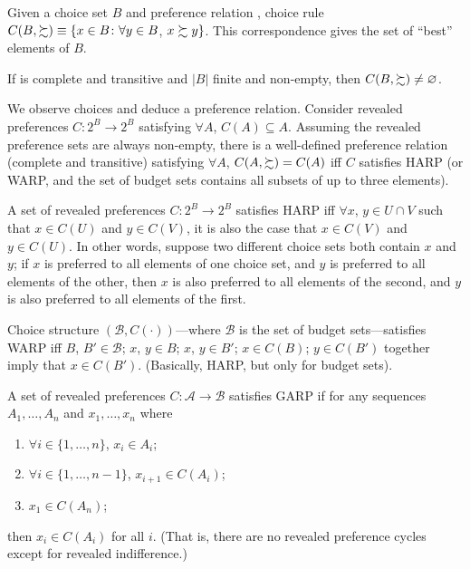 \documentclass[8pt,letterpaper, landscape]{extarticle} %
\begin{document}
\begin{multicols}{3}
\begin{description}
 Given a choice set $ B $ and preference relation \pref , choice rule $ C(B, \succsim ) \equiv \{ x \in B \colon \forall y \in B $, $ x \succsim y \} $. This correspondence gives the set of ``best'' elements of $ B $.

If \pref{} is complete and transitive and $ | B | $ finite and non-empty, then $ C(B, \succsim) \neq \varnothing $.

 We observe choices and deduce a preference relation. Consider revealed preferences $ C \colon 2^B \rightarrow 2^B $ satisfying $ \forall A $, $ C(A) \subseteq A $. Assuming the revealed preference sets are always non-empty, there is a well-defined preference relation \pref{} (complete and transitive) satisfying $ \forall A $, $ C(A, \succsim) = C(A) $ iff $ C $ satisfies HARP (or WARP, and the set of budget sets contains all subsets of up to three elements).

 A set of revealed preferences $ C \colon 2^B \rightarrow 2^B $ satisfies HARP iff $ \forall x $, $ y \in U \cap V $ such that $ x \in C(U) $ and $ y \in C(V) $, it is also the case that $ x \in C(V) $ and $ y \in C(U) $. In other words, suppose two different choice sets both contain $ x $ and $ y $; if $ x $ is preferred to all elements of one choice set, and $ y $ is preferred to all elements of the other, then $ x $ is also preferred to all elements of the second, and $ y $ is also preferred to all elements of the first.

 Choice structure $ (\mathcal{B}, C(\cdot)) $---where $ \mathcal{B} $ is the set of budget sets---satisfies WARP iff $ B $, $ B' \in \mathcal{B} $; $ x $, $ y \in B $; $ x $, $ y \in B' $; $ x \in C(B) $; $ y \in C(B') $ together imply that $ x \in C(B') $. (Basically, HARP, but only for budget sets).

 A set of revealed preferences $ C \colon \mathcal{A} \to \mathcal{B} $ satisfies GARP if for any sequences $ A_1, \dotsc , A_n $ and $ x_1, \dotsc , x_n $ where
\begin{enumerate}
\item $ \forall i \in \{1, \dotsc , n \} $, $ x_i \in A_i $;
\item $ \forall i \in \{1, \dotsc , n-1 \} $, $ x_{i+1} \in C(A_i) $;
\item $ x_1 \in C( A_n ) $;
\end{enumerate}
then $ x_i \in C(A_i) $ for all $ i $. (That is, there are no revealed preference cycles except for revealed indifference.)


\end{description}
\end{multicols}
\end{document}
